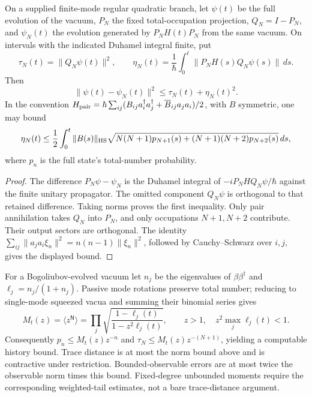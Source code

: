 \documentclass[12pt,a4paper]{article}
\begin{document}
\begin{theorem}
\label{p4:thm:v2109-finite-evolution-error}
On a supplied finite-mode regular quadratic branch, let \(\psi(t)\) be
the full evolution of the vacuum, \(P_N\) the fixed total-occupation
projection, \(Q_N=I-P_N\), and \(\psi_N(t)\) the evolution generated by
\(P_NH(t)P_N\) from the same vacuum.  On intervals with the indicated
Duhamel integral finite, put
\[
 \tau_N(t)=\|Q_N\psi(t)\|^2,\qquad
 \eta_N(t)=\frac1\hbar\int_0^t\|P_NH(s)Q_N\psi(s)\|\,ds.
\]
Then
\[
 \|\psi(t)-\psi_N(t)\|^2\le\tau_N(t)+\eta_N(t)^2.
\]
In the convention
\(H_{\rm pair}=\hbar\sum_{ij}(B_{ij}a_i^\dagger a_j^\dagger+
\overline B_{ij}a_ja_i)/2\), with \(B\) symmetric, one may bound
\[
 \eta_N(t)\le\frac12\int_0^t\|B(s)\|_{\rm HS}
 \sqrt{N(N+1)p_{N+1}(s)+(N+1)(N+2)p_{N+2}(s)}\,ds,
\]
where \(p_n\) is the full state's total-number probability.
\end{theorem}
\begin{proof}
The difference \(P_N\psi-\psi_N\) is the Duhamel integral of
\(-iP_NHQ_N\psi/\hbar\) against the finite unitary propagator.
The omitted component \(Q_N\psi\) is orthogonal to that retained
difference.  Taking norms proves the first inequality.
Only pair annihilation takes \(Q_N\) into \(P_N\), and only occupations
\(N+1,N+2\) contribute.  Their output sectors are orthogonal.  The
identity \(\sum_{ij}\|a_ja_i\xi_n\|^2=n(n-1)\|\xi_n\|^2\), followed
by Cauchy--Schwarz over \(i,j\), gives the displayed bound.
\end{proof}
For a Bogoliubov-evolved vacuum let \(n_j\) be the eigenvalues of
\(\beta\beta^\dagger\) and \(\ell_j=n_j/(1+n_j)\).  Passive mode
rotations preserve total number; reducing to single-mode squeezed vacua
and summing their binomial series gives
\[
 M_t(z)=\langle z^{\mathsf N}\rangle
 =\prod_j\sqrt{\frac{1-\ell_j(t)}{1-z^2\ell_j(t)}},\qquad
 z>1,\quad z^2\max_j\ell_j(t)<1.
\]
Consequently \(p_n\le M_t(z)z^{-n}\) and
\(\tau_N\le M_t(z)z^{-(N+1)}\), yielding a computable history bound.
Trace distance is at most the norm bound above and is contractive under
restriction.  Bounded-observable errors are at most twice the observable
norm times this bound.  Fixed-degree unbounded moments require the
corresponding weighted-tail estimates, not a bare trace-distance argument.
\end{document}
